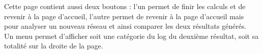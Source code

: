Cette page contient aussi deux boutons : l'un permet de finir les calculs et de revenir à la page d'accueil, l'autre permet de revenir à la page d'accueil mais pour analyser un nouveau réseau et ainsi comparer les deux résultats générés.\\
Un menu permet d'afficher soit une catégorie du log du deuxième résultat, soit sa totalité sur la droite de la page. 












 